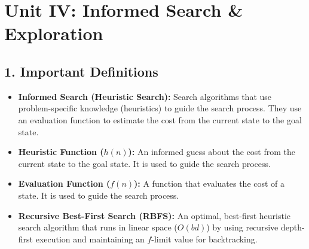 \section{Unit IV: Informed Search \& Exploration}

\subsection{1. Important Definitions}
\begin{itemize}
  \item   \textbf{Informed Search (Heuristic Search):} Search algorithms that use problem-specific knowledge (heuristics) to guide the search process. They use an evaluation function to estimate the cost from the current state to the goal state.
  \item   \textbf{Heuristic Function ($h(n)$):} An informed guess about the cost from the current state to the goal state. It is used to guide the search process.
  \item   \textbf{Evaluation Function ($f(n)$):} A function that evaluates the cost of a state. It is used to guide the search process.
  \item   \textbf{Recursive Best-First Search (RBFS):} An optimal, best-first heuristic search algorithm that runs in linear space ($O(bd)$) by using recursive depth-first execution and maintaining an $f$-limit value for backtracking.
\end{itemize}

